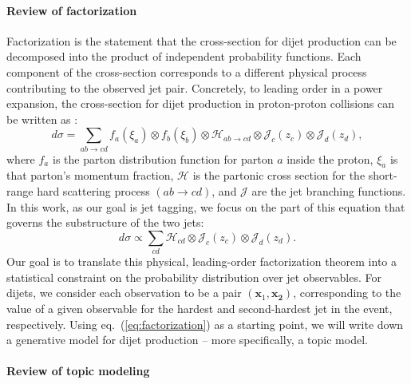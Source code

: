 \documentclass[a4paper,11pt]{article}
\newcommand{\bbm}[1]{\mathbf{#1}}
\newcommand{\bv}[1]{\bbm{#1}}
\DeclareRobustCommand{\Eq}[1]{eq.~(\ref{#1})}
\begin{document}
\paragraph{Review of factorization}
\label{subsec:factorization}

Factorization is the statement that the cross-section for dijet production can be decomposed into the product of independent probability functions.
Each component of the cross-section corresponds to a different physical process contributing to the observed jet pair.
Concretely, to leading order in a power expansion, the cross-section for dijet production in proton-proton collisions can be written as \cite{Ellis:1991qcd}:
\begin{equation}
\label{eq:factorization_full}
d\sigma = \sum_{ab \to cd} f_{a}(\xi_a) \otimes f_{b}(\xi_b) \otimes \mathcal{H}_{ab \to cd} \otimes \mathcal{J}_c(z_c) \otimes \mathcal{J}_d(z_d),
\end{equation}
where $f_a$ is the parton distribution function for parton $a$ inside the proton, $\xi_a$ is that parton's momentum fraction, $\mathcal{H}$ is the partonic cross section for the short-range hard scattering process $(ab \to cd)$, and $\mathcal{J}$ are the jet branching functions.
In this work, as our goal is jet tagging, we focus on the part of this equation that governs the substructure of the two jets:
\begin{equation}
\label{eq:factorization}
d\sigma \propto \sum_{cd} \mathcal{H}_{cd} \otimes \mathcal{J}_c(z_c) \otimes \mathcal{J}_d(z_d).
\end{equation}
Our goal is to translate this physical, leading-order factorization theorem into a statistical constraint on the probability distribution over jet observables.
For dijets, we consider each observation to be a pair $(\bv{x}_1, \bv{x_2})$, corresponding to the value of a given observable for the hardest and second-hardest jet in the event, respectively.
Using \Eq{eq:factorization} as a starting point, we will write down a generative model for dijet production -- more specifically, a topic model.

\paragraph{Review of topic modeling}
\label{subsec:topic}
\end{document}
